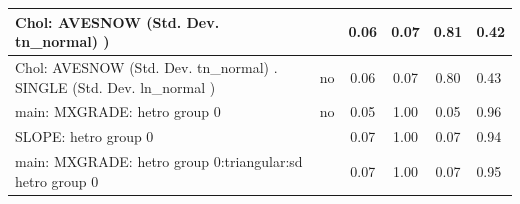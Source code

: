 \begin{table}
\begin{center}
\begin{tabular}{|l|l|c|c|c|l|}
			\hline
			 Chol: AVESNOW (Std. Dev. tn_normal) ) &  & 0.06 & 0.07 & 0.81 & 0.42 \\
			\hline
			 Chol: AVESNOW (Std. Dev. tn_normal) . SINGLE (Std. Dev.   ln_normal ) & no & 0.06 & 0.07 & 0.80 & 0.43 \\
			\hline
			main: MXGRADE: hetro group 0 & no & 0.05 & 1.00 & 0.05 & 0.96 \\
			\hline
			SLOPE: hetro group 0 &  & 0.07 & 1.00 & 0.07 & 0.94 \\
			\hline
			main: MXGRADE: hetro group 0:triangular:sd  hetro group 0 &  & 0.07 & 1.00 & 0.07 & 0.95 \\
			\hline
		\end{tabular}
	\end{center}
\end{table}